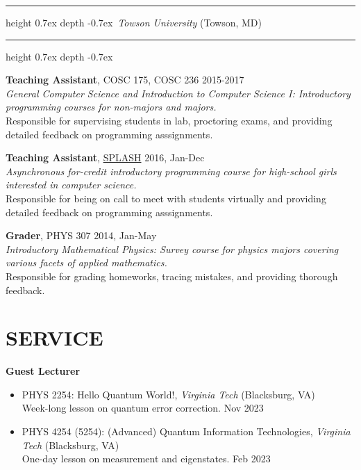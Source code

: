 \documentclass[marginmode, 10pt]{res} %
\def\Vhrulefill{\leavevmode\leaders\hrule height 0.7ex depth \dimexpr0.4pt-0.7ex\hfill\kern0pt}         %
\begin{document}
\begin{resume}
\Vhrulefill ~\textit{Towson University} (Towson, MD)~ \Vhrulefill

\textbf{Teaching Assistant}, COSC 175, COSC 236 \hfill 2015-2017 \\
\textit{General Computer Science and Introduction to Computer Science I: Introductory programming courses for non-majors and majors.} \\
Responsible for supervising students in lab, proctoring exams, and providing detailed feedback on programming asssignments.

\textbf{Teaching Assistant}, \href{https://wp.towson.edu/secured-lab/home-page/splash-about/}{SPLASH} \hfill 2016, Jan-Dec \\
\textit{Asynchronous for-credit introductory programming course for high-school girls interested in computer science.} \\
Responsible for being on call to meet with students virtually and providing detailed feedback on programming asssignments.

\textbf{Grader}, PHYS 307 \hfill 2014, Jan-May \\
\textit{Introductory Mathematical Physics: Survey course for physics majors covering various facets of applied mathematics.} \\
Responsible for grading homeworks, tracing mistakes, and providing thorough feedback.



\pagebreak

\section{\small{SERVICE}}

\textbf{Guest Lecturer}
\begin{itemize}
    \item PHYS 2254: Hello Quantum World!, \textit{Virginia Tech} (Blacksburg, VA) \\
    Week-long lesson on quantum error correction. \hfill Nov 2023
    \item PHYS 4254 (5254): (Advanced) Quantum Information Technologies, \textit{Virginia Tech} (Blacksburg, VA) \\
    One-day lesson on measurement and eigenstates. \hfill Feb 2023
\end{itemize}


\end{resume}
\end{document}
